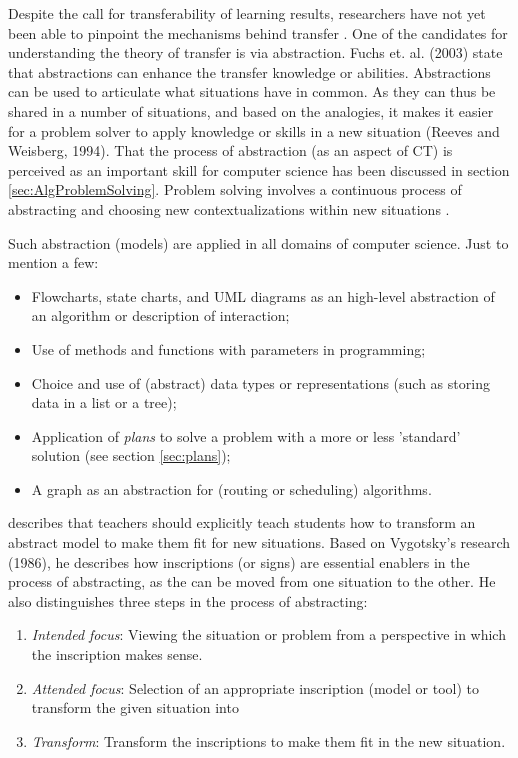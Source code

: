 Despite the call for transferability of learning results, researchers have not yet been able to pinpoint the mechanisms behind transfer \cite{oers2004recontextualization}. One of the candidates for understanding the theory of transfer is via abstraction. Fuchs et. al. (2003) state that abstractions can enhance the transfer knowledge or abilities. Abstractions can be used to articulate what situations have in common. As they can thus be shared in a number of situations, and based on the analogies, it makes it easier for a problem solver to apply knowledge or skills in a new situation (Reeves and Weisberg, 1994). That the process of abstraction (as an aspect of CT) is perceived as an important skill for computer science has been discussed in section \ref{sec:AlgProblemSolving}. Problem solving involves a continuous process of abstracting and choosing new contextualizations within new situations \cite{oers2004recontextualization}.


Such abstraction (models) are applied in all domains of computer science. Just to mention a few:
\begin{itemize}
\item Flowcharts, state charts, and UML diagrams as an high-level abstraction of an algorithm or description of interaction;
\item Use of methods and functions with parameters in programming;
\item Choice and use of (abstract) data types or representations (such as storing data in a list or a tree);
\item Application of \textit{plans} to solve a problem with a more or less 'standard' solution (see section \ref{sec:plans});
\item A graph as an abstraction for (routing or scheduling) algorithms.
\end{itemize}


 describes that teachers should explicitly teach students how to transform an abstract model to make them fit for new situations. Based on Vygotsky's research (1986), he describes how inscriptions (or signs) are essential enablers in the process of abstracting, as the can be moved from one situation to the other. He also distinguishes three steps in the process of abstracting:
\begin{enumerate}
\item \textit{Intended focus}: Viewing the situation or problem from a perspective in which the inscription makes sense.

\item \textit{Attended focus}: Selection of an appropriate inscription (model or tool) to transform the given situation into

\item \textit{Transform}: Transform the inscriptions to make them fit in the new situation.
\end{enumerate}


